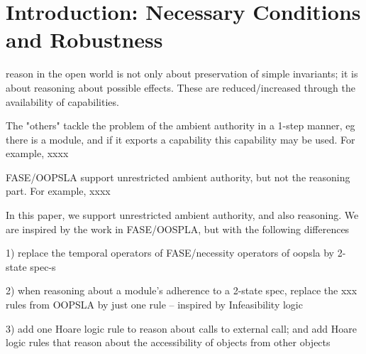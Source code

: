 \section{Introduction: Necessary Conditions and Robustness}
\label{s:intro}

reason in the open world is not only about preservation of simple invariants; it is about reasoning about possible effects. These are reduced/increased through the availability of capabilities.

The "others" tackle the problem of the ambient authority in a 1-step manner, eg there is a module, and if it exports a capability this capability may be used. For example, xxxx 

FASE/OOPSLA support unrestricted ambient authority, but not the reasoning part. For example, xxxx

In this paper, we support unrestricted ambient authority, and also reasoning. We are inspired by the work in FASE/OOSPLA, but with the following differences

1) replace the temporal operators of FASE/necessity operators of oopsla by 2-state spec-s 

2) when reasoning about a module's adherence to a 2-state spec, replace the xxx rules from OOPSLA by just one rule -- inspired by Infeasibility logic

3) add one Hoare logic rule to reason about calls to external call; and add Hoare logic rules that reason about the accessibility of objects from other objects


